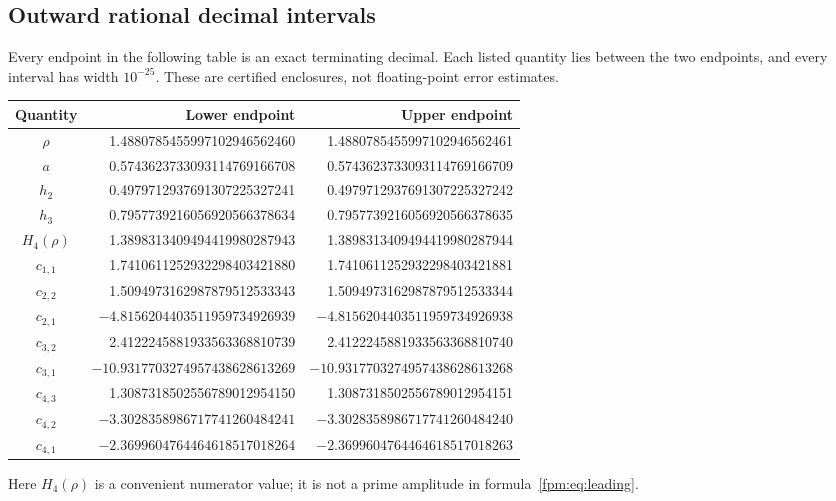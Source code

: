 \documentclass[11pt]{article}
\theoremstyle{definition}\newtheorem{definition}[theorem]{Definition}
\theoremstyle{remark}\newtheorem{remark}[theorem]{Remark}
\begin{document}
\subsection{Outward rational decimal intervals}
Every endpoint in the following table is an exact terminating decimal. Each listed quantity lies between the two endpoints, and every interval has width $10^{-25}$. These are certified enclosures, not floating-point error estimates.
\begin{center}\small
\begin{tabular}{c r r}
\toprule
Quantity & Lower endpoint & Upper endpoint\\
\midrule
$\rho$&1.4880785455997102946562460&1.4880785455997102946562461\\
$a$&0.5743623733093114769166708&0.5743623733093114769166709\\
$h_2$&0.4979712937691307225327241&0.4979712937691307225327242\\
$h_3$&0.7957739216056920566378634&0.7957739216056920566378635\\
$H_4(\rho)$&1.3898313409494419980287943&1.3898313409494419980287944\\
$c_{1,1}$&1.7410611252932298403421880&1.7410611252932298403421881\\
$c_{2,2}$&1.5094973162987879512533343&1.5094973162987879512533344\\
$c_{2,1}$&$-4.8156204403511959734926939$&$-4.8156204403511959734926938$\\
$c_{3,2}$&2.4122245881933563368810739&2.4122245881933563368810740\\
$c_{3,1}$&$-10.9317703274957438628613269$&$-10.9317703274957438628613268$\\
$c_{4,3}$&1.3087318502556789012954150&1.3087318502556789012954151\\
$c_{4,2}$&$-3.3028358986717741260484241$&$-3.3028358986717741260484240$\\
$c_{4,1}$&$-2.3699604764464618517018264$&$-2.3699604764464618517018263$\\
\bottomrule
\end{tabular}
\end{center}
Here $H_4(\rho)$ is a convenient numerator value; it is not a prime amplitude in formula~\eqref{fpm:eq:leading}.
\end{document}
